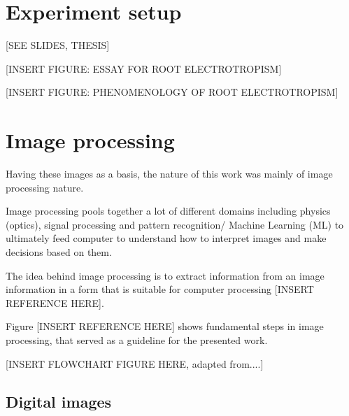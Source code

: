 \section{Experiment setup}

[SEE SLIDES, THESIS]

[INSERT FIGURE: ESSAY FOR ROOT ELECTROTROPISM]

[INSERT FIGURE: PHENOMENOLOGY OF ROOT ELECTROTROPISM]


\section{Image processing}

Having these images as a basis, the nature of this work was mainly of image processing nature.

Image processing pools together a lot of different domains including physics (optics), signal processing and pattern recognition/ Machine Learning (ML) to ultimately feed computer to understand how to interpret images and make decisions based on them. 

The idea behind image processing is to extract information from an image information in a form that is suitable for computer processing [INSERT REFERENCE HERE]. 

Figure [INSERT REFERENCE HERE] shows fundamental steps in image processing, that served as a guideline for the presented work.



[INSERT FLOWCHART FIGURE HERE, adapted from....]


\subsection{Digital images}

